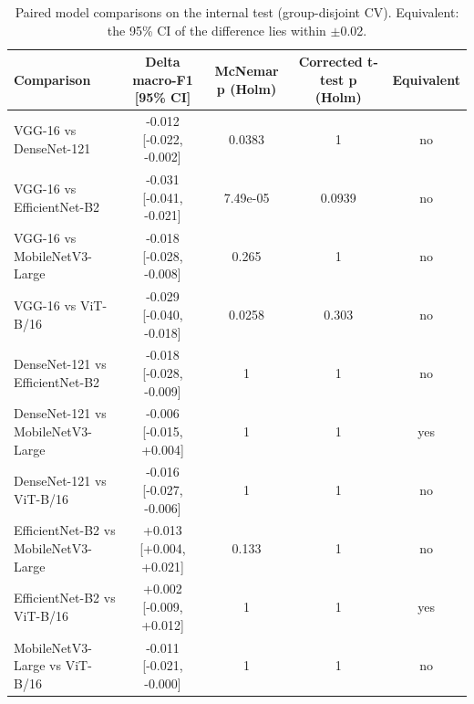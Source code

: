 \begin{table}[!tbp]
\centering
\caption{Paired model comparisons on the internal test (group-disjoint CV). Equivalent: the 95\% CI of the difference lies within $\pm$0.02.}
\label{tab:pairwise}
\footnotesize
\begin{tabular}{lcccc}
\hline
Comparison & Delta macro-F1 [95\% CI] & McNemar p (Holm) & Corrected t-test p (Holm) & Equivalent \\
\hline
VGG-16 vs DenseNet-121 & -0.012 [-0.022, -0.002] & 0.0383 & 1 & no \\
VGG-16 vs EfficientNet-B2 & -0.031 [-0.041, -0.021] & 7.49e-05 & 0.0939 & no \\
VGG-16 vs MobileNetV3-Large & -0.018 [-0.028, -0.008] & 0.265 & 1 & no \\
VGG-16 vs ViT-B/16 & -0.029 [-0.040, -0.018] & 0.0258 & 0.303 & no \\
DenseNet-121 vs EfficientNet-B2 & -0.018 [-0.028, -0.009] & 1 & 1 & no \\
DenseNet-121 vs MobileNetV3-Large & -0.006 [-0.015, +0.004] & 1 & 1 & yes \\
DenseNet-121 vs ViT-B/16 & -0.016 [-0.027, -0.006] & 1 & 1 & no \\
EfficientNet-B2 vs MobileNetV3-Large & +0.013 [+0.004, +0.021] & 0.133 & 1 & no \\
EfficientNet-B2 vs ViT-B/16 & +0.002 [-0.009, +0.012] & 1 & 1 & yes \\
MobileNetV3-Large vs ViT-B/16 & -0.011 [-0.021, -0.000] & 1 & 1 & no \\
\hline
\end{tabular}
\end{table}
